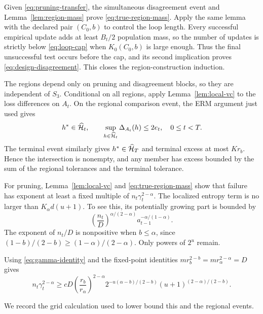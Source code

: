 Given \eqref{eq:pruning-transfer}, the simultaneous disagreement event and Lemma~\ref{lem:region-mass} prove \eqref{eq:true-region-mass}. Apply the same lemma with the declared pair $(C_0,b)$ to control the loop length. Every successful empirical update adds at least $B_t/2$ population mass, so the number of updates is strictly below \eqref{eq:loop-cap} when $K_0(C_0,b)$ is large enough. Thus the final unsuccessful test occurs before the cap, and its second implication proves \eqref{eq:design-disagreement}. This closes the region-construction induction.

The regions depend only on pruning and disagreement blocks, so they are independent of $S_3$. Conditional on all regions, apply Lemma~\ref{lem:local-vc} to the loss differences on $A_t$. On the regional comparison event, the ERM argument just used gives
\begin{equation}
 h^*\in\widehat{\mathcal H}_t,\qquad
 \sup_{h\in\widehat{\mathcal H}_t}\Delta_{A_t}(h)\leq2e_t,
 \quad 0\leq t<T.
 \label{eq:regional-transfer}
\end{equation}
The terminal event similarly gives $h^*\in\widehat{\mathcal H}_T$ and terminal excess at most $K r_b$. Hence the intersection is nonempty, and any member has excess bounded by the sum of the regional tolerances and the terminal tolerance.

For pruning, Lemma~\ref{lem:local-vc} and \eqref{eq:true-region-mass} show that failure has exponent at least a fixed multiple of $n_t\gamma_t^{2-\alpha}$. The localized entropy term is no larger than $K_\alpha d(u+1)$. To see this, its potentially growing part is bounded by
\[
 \left(\frac{n_t}{D}\right)^{\alpha/(2-\alpha)}
 a_{t-1}^{-\alpha/(1-\alpha)}.
\]
The exponent of $n_t/D$ is nonpositive when $b\leq\alpha$, since $(1-b)/(2-b)\geq(1-\alpha)/(2-\alpha)$. Only powers of $2^u$ remain.

Using \eqref{eq:gamma-identity} and the fixed-point identities $mr_b^{2-b}=mr_\alpha^{2-\alpha}=D$ gives
\begin{equation}
 n_t\gamma_t^{2-\alpha}
 \geq cD
 \left(\frac{r_b}{r_\alpha}\right)^{2-\alpha}
 2^{-u(\alpha-b)/(2-b)}
 (u+1)^{(2-\alpha)/(2-b)}.
 \label{eq:exact-pruning}
\end{equation}

We record the grid calculation used to lower bound this and the regional events.

